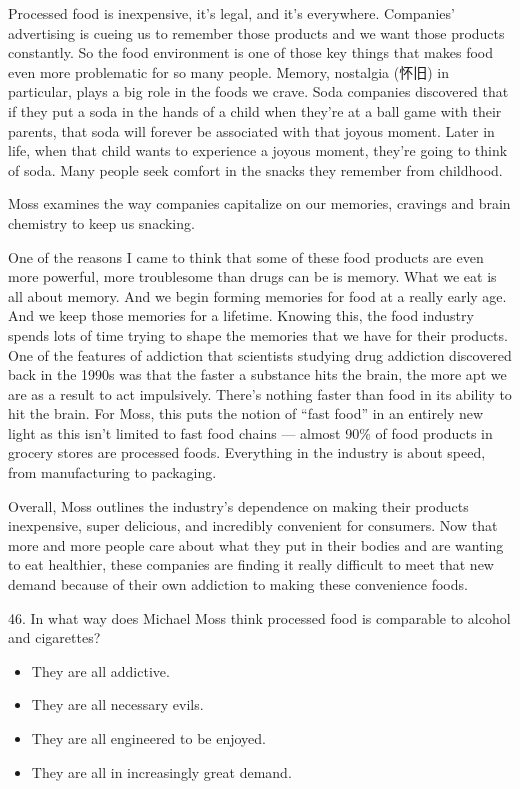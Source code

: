 \documentclass[UTF8,11pt]{ctexart}
\begin{document}
Processed food is inexpensive, it’s legal, and it’s everywhere. Companies’ advertising is cueing us to remember those products and we want those products constantly. So the food environment is one of those key things that makes food even more problematic for so many people. Memory, nostalgia (怀旧) in particular, plays a big role in the foods we crave. Soda companies discovered that if they put a soda in the hands of a child when they’re at a ball game with their parents, that soda will forever be associated with that joyous moment. Later in life, when that child wants to experience a joyous moment, they’re going to think of soda. Many people seek comfort in the snacks they remember from childhood.


Moss examines the way companies capitalize on our memories, cravings and brain chemistry to keep us snacking.


One of the reasons I came to think that some of these food products are even more powerful, more troublesome than drugs can be is memory. What we eat is all about memory. And we begin forming memories for food at a really early age. And we keep those memories for a lifetime. Knowing this, the food industry spends lots of time trying to shape the memories that we have for their products. One of the features of addiction that scientists studying drug addiction discovered back in the 1990s was that the faster a substance hits the brain, the more apt we are as a result to act impulsively. There’s nothing faster than food in its ability to hit the brain. For Moss, this puts the notion of “fast food” in an entirely new light as this isn’t limited to fast food chains — almost 90\% of food products in grocery stores are processed foods. Everything in the industry is about speed, from manufacturing to packaging.


Overall, Moss outlines the industry’s dependence on making their products inexpensive, super delicious, and incredibly convenient for consumers. Now that more and more people care about what they put in their bodies and are wanting to eat healthier, these companies are finding it really difficult to meet that new demand because of their own addiction to making these convenience foods.


46. In what way does Michael Moss think processed food is comparable to alcohol and cigarettes?


\begin{itemize}[leftmargin=2em,itemsep=.2em,topsep=.4em]\item[A.] They are all addictive.
\item[B.] They are all necessary evils.
\item[C.] They are all engineered to be enjoyed.
\item[D.] They are all in increasingly great demand.
\end{itemize}
\end{document}
